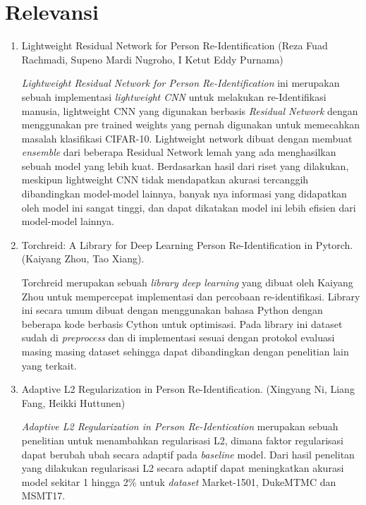 \section{Relevansi}
\begin{enumerate}
    \item Lightweight Residual Network for Person Re-Identification (Reza Fuad Rachmadi, Supeno Mardi Nugroho, I Ketut Eddy Purnama) \cite{cit:14}
    \par
	\textit{Lightweight Residual Network for Person Re-Identification} ini merupakan sebuah implementasi \textit{lightweight CNN} untuk melakukan re-Identifikasi manusia, lightweight CNN yang digunakan berbasis \textit{Residual Network} dengan menggunakan pre trained weights yang pernah  digunakan untuk memecahkan masalah klasifikasi CIFAR-10. Lightweight network dibuat dengan membuat \textit{ensemble} dari beberapa Residual Network lemah yang ada menghasilkan sebuah model yang lebih kuat. Berdasarkan hasil dari riset yang dilakukan, meskipun lightweight CNN tidak mendapatkan akurasi tercanggih dibandingkan model-model lainnya, banyak nya informasi yang didapatkan oleh model ini sangat tinggi, dan dapat dikatakan model ini lebih efisien dari model-model lainnya.
    \vspace{1ex}
    
    \item Torchreid: A Library for Deep Learning Person Re-Identification in Pytorch. (Kaiyang Zhou, Tao Xiang). \cite{cit:16}
    \par
	 Torchreid merupakan sebuah \textit{library deep learning} yang dibuat oleh Kaiyang Zhou untuk mempercepat implementasi dan percobaan re-identifikasi. Library ini secara umum dibuat dengan menggunakan bahasa Python dengan beberapa kode berbasis Cython untuk optimisasi. Pada library ini dataset sudah di \textit{preprocess} dan di implementasi sesuai dengan protokol evaluasi masing masing dataset sehingga dapat dibandingkan dengan penelitian lain yang terkait.
    \vspace{1ex}
    
    \item Adaptive L2 Regularization in Person Re-Identification. (Xingyang Ni, Liang Fang, Heikki Huttunen) \cite{cit:17}
    \par
    
    \textit{Adaptive L2 Regularization in Person Re-Identication} merupakan sebuah penelitian untuk menambahkan regularisasi L2, dimana faktor regularisasi dapat berubah ubah secara adaptif pada \textit{baseline} model. Dari hasil penelitan yang dilakukan regularisasi L2 secara adaptif dapat meningkatkan akurasi model sekitar 1 hingga 2\% untuk \textit{dataset} Market-1501, DukeMTMC dan MSMT17.
    \vspace{1ex}
    

\end{enumerate}
